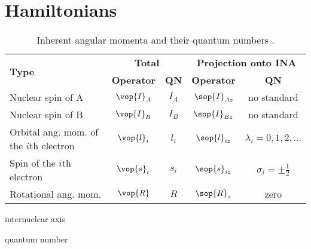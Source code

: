 \chapter{Hamiltonians}

\begin{table}[H]
    \centering
    \caption{Inherent angular momenta and their quantum numbers \cite[72]{lefebvre-brionSpectraDynamicsDiatomic2004}.}
    \begin{threeparttable}
        \begin{tabular}{lcccc}
            \toprule
            \multirow{2}{*}{\textbf{Type}}          & \multicolumn{2}{c}{\textbf{Total}} & \multicolumn{2}{c}{\textbf{Projection onto INA}\tnote{\dag}}                                                    \\
            \cmidrule(lr){2-3} \cmidrule(lr){4-5}
            & \textbf{Operator}                  & \textbf{QN}\tnote{\ddag}                             & \textbf{Operator} & \textbf{QN}                  \\
            \midrule
            Nuclear spin of A                       & $\vop{I}_A$                        & $I_A$                                   & $\sop{I}_{Az}$    & no standard                  \\
            Nuclear spin of B                       & $\vop{I}_B$                        & $I_B$                                   & $\sop{I}_{Bz}$    & no standard                  \\
            Orbital ang. mom. of the $i$th electron & $\vop{l}_i$                        & $l_i$                                   & $\sop{l}_{iz}$    & $\lambda_i = 0, 1, 2, \dots$ \\
            Spin of the $i$th electron              & $\vop{s}_i$                        & $s_i$                                   & $\sop{s}_{iz}$    & $\sigma_i = \pm\frac{1}{2}$  \\
            Rotational ang. mom.                    & $\vop{R}$                          & $R$                                     & $\sop{R}_z$       & zero                         \\
            \bottomrule
        \end{tabular}
        \begin{tablenotes}
        \item [\dag] internuclear axis
        \item [\ddag] quantum number
        \end{tablenotes}
    \end{threeparttable}
\end{table}

